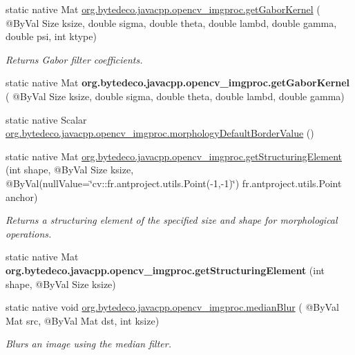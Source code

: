 \begin{DoxyCompactItemize}
\item 
static native Mat \hyperlink{group__imgproc__filter_ga8c30992daccc2467cea3d7d2f016a9ab}{org.\+bytedeco.\+javacpp.\+opencv\+\_\+imgproc.\+get\+Gabor\+Kernel} ( @By\+Val Size ksize, double sigma, double theta, double lambd, double gamma, double psi, int ktype)
\begin{DoxyCompactList}\small\item\em Returns Gabor filter coefficients. \end{DoxyCompactList}\item 
\mbox{\label{group__imgproc__filter_gae7ca988b2551ca6bc75e4ec85bb116fe}} 
static native Mat {\bfseries org.\+bytedeco.\+javacpp.\+opencv\+\_\+imgproc.\+get\+Gabor\+Kernel} ( @By\+Val Size ksize, double sigma, double theta, double lambd, double gamma)
\item 
static native Scalar \hyperlink{group__imgproc__filter_gaa77a7ec53d115ff76de4c8797d6d83f7}{org.\+bytedeco.\+javacpp.\+opencv\+\_\+imgproc.\+morphology\+Default\+Border\+Value} ()
\item 
static native Mat \hyperlink{group__imgproc__filter_ga18af407581ba537b9095d14090cce31a}{org.\+bytedeco.\+javacpp.\+opencv\+\_\+imgproc.\+get\+Structuring\+Element} (int shape, @By\+Val Size ksize, @By\+Val(null\+Value=\char`\"{}cv\+::\+fr.antproject.utils.Point(-\/1,-\/1)\char`\"{}) fr.antproject.utils.Point anchor)
\begin{DoxyCompactList}\small\item\em Returns a structuring element of the specified size and shape for morphological operations. \end{DoxyCompactList}\item 
\mbox{\label{group__imgproc__filter_ga0840116f63e9ca427336aed0a2d8ca55}} 
static native Mat {\bfseries org.\+bytedeco.\+javacpp.\+opencv\+\_\+imgproc.\+get\+Structuring\+Element} (int shape, @By\+Val Size ksize)
\item 
static native void \hyperlink{group__imgproc__filter_ga6a7fd362c0b073cd051d4fcb7a9904c9}{org.\+bytedeco.\+javacpp.\+opencv\+\_\+imgproc.\+median\+Blur} ( @By\+Val Mat src, @By\+Val Mat dst, int ksize)
\begin{DoxyCompactList}\small\item\em Blurs an image using the median filter. \end{DoxyCompactList}\item 
\mbox{\label{group__imgproc__filter_gaadee3f7173f2333706cd6c0386947dfe}} 

\end{DoxyCompactItemize}
